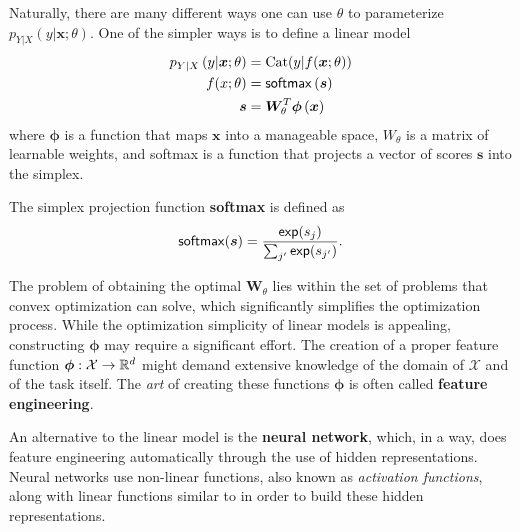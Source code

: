 \noindent Naturally, there are many different ways one can use $\theta$ to
parameterize $p_{Y|X}\left(y|\bm{x};\theta\right)$. One of the simpler ways
is to define a linear model
%
\begin{align}
    p_{Y|X}\left(y|\bm{x};\theta\right) & = \text{Cat}(y|f(\bm x; \theta)) \\
    f(x; \theta)                        & = \operatorname*{\mathsf{softmax}} \left(\bm{s}\right)   \\
    \bm{s}                              & 
    = \bm{W}_{\theta}^T\bm{\phi}\left(\bm{x}\right) \label{eq:linear}
\end{align}
%
where $\bm{\phi}$ is a function that maps $\bm{x}$ into a
manageable space, $W_{\theta}$ is a matrix of learnable weights, and
softmax is a function that projects a vector of scores $\bm{s}$ into
the simplex.

\begin{definition}[softmax]
    The simplex projection function \textbf{softmax} is defined as
    \begin{equation}\label{eq:softmax}
        \operatorname*{\mathsf{softmax}}(\bm{s}) = \frac{\operatorname*{\mathsf{exp}}(s_j)}{\sum_{j'} \operatorname*{\mathsf{exp}}(s_{j'})}.
    \end{equation}
\end{definition}

The problem of obtaining the optimal $\bm{W}_{\theta}$ lies
within the set of problems that convex optimization can solve, which
significantly simplifies the optimization process. While the
optimization simplicity of linear models is appealing, constructing
$\bm{\phi}$ may require a significant effort. The creation of a
proper feature function $\bm{\phi}: \mathcal{X} \rightarrow \mathbb{R}^d$ might
demand extensive knowledge of the domain of $\mathcal{X}$ and of the
task itself. The \textit{art} of creating these functions $\bm{\phi}$
is often called \textbf{feature engineering}.

An alternative to the linear model is the \textbf{neural network}, which, in a
way, does feature engineering automatically through the use of hidden
representations. Neural networks use non-linear functions, also known
as \textit{activation functions}, along with linear functions similar
to  in order to build these hidden representations.

